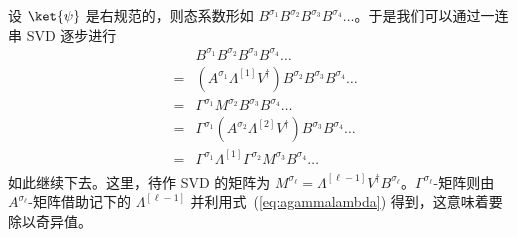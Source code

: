 设 $\ket{\psi}$ 是右规范的，则态系数形如 $B^{\sigma_1}B^{\sigma_2}B^{\sigma_3}B^{\sigma_4}\ldots$。于是我们可以通过一连串 SVD 逐步进行
\begin{eqnarray*}
& & B^{\sigma_1}B^{\sigma_2}B^{\sigma_3}B^{\sigma_4} \ldots \\
&=& (A^{\sigma_1} \Lambda^{[1]} V^\dagger) B^{\sigma_2}B^{\sigma_3}B^{\sigma_4} \ldots \\
&=& \Gamma^{\sigma_1} M^{\sigma_2} B^{\sigma_3}B^{\sigma_4} \ldots \\
&=& \Gamma^{\sigma_1} (A^{\sigma_2}  \Lambda^{[2]} V^\dagger) B^{\sigma_3}B^{\sigma_4} \ldots \\
&=& \Gamma^{\sigma_1} \Lambda^{[1]} \Gamma^{\sigma_2} M^{\sigma_3} B^{\sigma_4} \ldots \\
\end{eqnarray*} 
如此继续下去。这里，待作 SVD 的矩阵为 $M^{\sigma_\ell} = \Lambda^{[\ell-1]} V^\dagger B^{\sigma_\ell}$。$\Gamma^{\sigma_\ell}$-矩阵则由 $A^{\sigma_\ell}$-矩阵借助记下的 $\Lambda^{[\ell-1]}$ 并利用式~(\ref{eq:agammalambda}) 得到，这意味着要除以奇异值。

